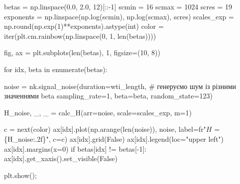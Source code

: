 \documentclass[
  letterpaper,
]{report}
\newenvironment{Shaded}{\begin{snugshade}}{\end{snugshade}}
\newcommand{\BuiltInTok}[1]{\textcolor[rgb]{0.00,0.23,0.31}{#1}}
\newcommand{\CommentTok}[1]{\textcolor[rgb]{0.37,0.37,0.37}{#1}}
\newcommand{\ControlFlowTok}[1]{\textcolor[rgb]{0.00,0.23,0.31}{#1}}
\newcommand{\DecValTok}[1]{\textcolor[rgb]{0.68,0.00,0.00}{#1}}
\newcommand{\FloatTok}[1]{\textcolor[rgb]{0.68,0.00,0.00}{#1}}
\newcommand{\KeywordTok}[1]{\textcolor[rgb]{0.00,0.23,0.31}{#1}}
\newcommand{\NormalTok}[1]{\textcolor[rgb]{0.00,0.23,0.31}{#1}}
\newcommand{\OperatorTok}[1]{\textcolor[rgb]{0.37,0.37,0.37}{#1}}
\newcommand{\SpecialCharTok}[1]{\textcolor[rgb]{0.37,0.37,0.37}{#1}}
\newcommand{\StringTok}[1]{\textcolor[rgb]{0.13,0.47,0.30}{#1}}
\newcommand{\VariableTok}[1]{\textcolor[rgb]{0.07,0.07,0.07}{#1}}
\newcommand{\VerbatimStringTok}[1]{\textcolor[rgb]{0.13,0.47,0.30}{#1}}
\begin{document}
\begin{Shaded}
\begin{Highlighting}[]
\NormalTok{betas }\OperatorTok{=}\NormalTok{ np.linspace(}\FloatTok{0.0}\NormalTok{, }\FloatTok{2.0}\NormalTok{, }\DecValTok{12}\NormalTok{)[::}\OperatorTok{{-}}\DecValTok{1}\NormalTok{]}
\NormalTok{scmin }\OperatorTok{=} \DecValTok{16}
\NormalTok{scmax }\OperatorTok{=} \DecValTok{1024}
\NormalTok{scres }\OperatorTok{=} \DecValTok{19}
\NormalTok{exponents }\OperatorTok{=}\NormalTok{ np.linspace(np.log(scmin), np.log(scmax), scres)}
\NormalTok{scales\_exp }\OperatorTok{=}\NormalTok{ np.}\BuiltInTok{round}\NormalTok{(np.exp(}\DecValTok{1}\NormalTok{)}\OperatorTok{**}\NormalTok{exponents).astype(}\BuiltInTok{int}\NormalTok{)}
\NormalTok{color }\OperatorTok{=} \BuiltInTok{iter}\NormalTok{(plt.cm.rainbow(np.linspace(}\DecValTok{0}\NormalTok{, }\DecValTok{1}\NormalTok{, }\BuiltInTok{len}\NormalTok{(betas))))}

\NormalTok{fig, ax }\OperatorTok{=}\NormalTok{ plt.subplots(}\BuiltInTok{len}\NormalTok{(betas), }\DecValTok{1}\NormalTok{, figsize}\OperatorTok{=}\NormalTok{(}\DecValTok{10}\NormalTok{, }\DecValTok{8}\NormalTok{))}

\ControlFlowTok{for}\NormalTok{ idx, beta }\KeywordTok{in} \BuiltInTok{enumerate}\NormalTok{(betas):}

\NormalTok{    noise }\OperatorTok{=}\NormalTok{ nk.signal\_noise(duration}\OperatorTok{=}\NormalTok{wti\_length,  }\CommentTok{\# генеруємо шум із різними значеннями beta }
\NormalTok{                              sampling\_rate}\OperatorTok{=}\DecValTok{1}\NormalTok{, }
\NormalTok{                              beta}\OperatorTok{=}\NormalTok{beta, }
\NormalTok{                              random\_state}\OperatorTok{=}\DecValTok{123}\NormalTok{)   }

\NormalTok{    H\_noise, \_, \_ }\OperatorTok{=}\NormalTok{ calc\_H(arr}\OperatorTok{=}\NormalTok{noise, scale}\OperatorTok{=}\NormalTok{scales\_exp, m}\OperatorTok{=}\DecValTok{1}\NormalTok{)}

\NormalTok{    c }\OperatorTok{=} \BuiltInTok{next}\NormalTok{(color)}
\NormalTok{    ax[idx].plot(np.arange(}\BuiltInTok{len}\NormalTok{(noise)), noise, label}\OperatorTok{=}\VerbatimStringTok{fr"$H$ = }\SpecialCharTok{\{}\NormalTok{H\_noise}\SpecialCharTok{:.2f\}}\VerbatimStringTok{"}\NormalTok{, c}\OperatorTok{=}\NormalTok{c)}
\NormalTok{    ax[idx].grid(}\VariableTok{False}\NormalTok{)}
\NormalTok{    ax[idx].legend(loc}\OperatorTok{=}\StringTok{"upper left"}\NormalTok{)}
\NormalTok{    ax[idx].margins(x}\OperatorTok{=}\DecValTok{0}\NormalTok{)}
    \ControlFlowTok{if}\NormalTok{ betas[idx] }\OperatorTok{!=}\NormalTok{ betas[}\OperatorTok{{-}}\DecValTok{1}\NormalTok{]: }
\NormalTok{        ax[idx].get\_xaxis().set\_visible(}\VariableTok{False}\NormalTok{)}

\NormalTok{plt.show()}\OperatorTok{;}
\end{Highlighting}
\end{Shaded}
\end{document}
